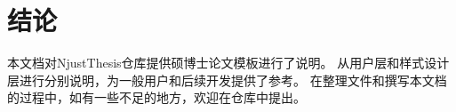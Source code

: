 \chapter{结论}
\label{chap:chap5}

本文档对NjustThesis仓库提供硕博士论文模板进行了说明。
从用户层和样式设计层进行分别说明，为一般用户和后续开发提供了参考。
在整理文件和撰写本文档的过程中，如有一些不足的地方，欢迎在仓库中提出。





